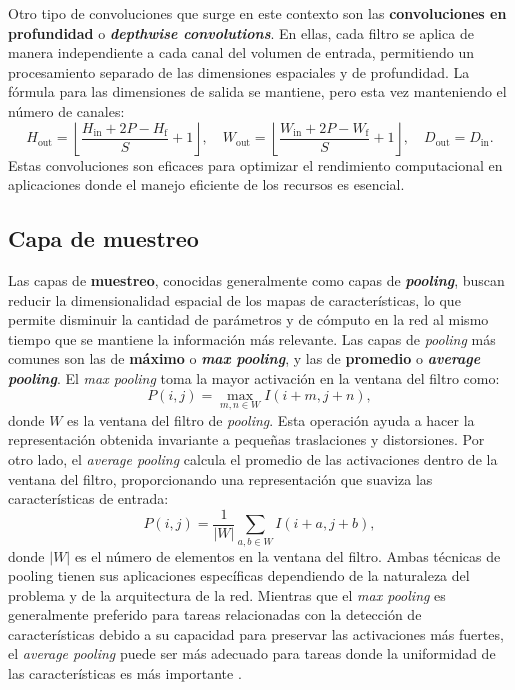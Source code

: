 Otro tipo de convoluciones que surge en este contexto son las \textbf{convoluciones
	en profundidad} o \textbf{\textit{depthwise convolutions}}. En ellas, cada
filtro se aplica de manera independiente a cada canal del volumen de entrada, permitiendo
un procesamiento separado de las dimensiones espaciales y de profundidad. La
fórmula para las dimensiones de salida se mantiene, pero esta vez manteniendo el
número de canales:
\[
H_{\text{out}}= \left\lfloor \frac{H_{\text{in}}+ 2P - H_{\text{f}}}{S}+ 1 \right
\rfloor, \quad W_{\text{out}}= \left\lfloor \frac{W_{\text{in}}+ 2P - W_{\text{f}}}{S}
+ 1 \right\rfloor, \quad D_{\text{out}}= D_{\text{in}}.
\]
Estas convoluciones son eficaces para optimizar el rendimiento computacional en
aplicaciones donde el manejo eficiente de los recursos es esencial.

\subsection{Capa de muestreo}

Las capas de \textbf{muestreo}, conocidas generalmente como capas de \textbf{\textit{pooling}},
buscan reducir la dimensionalidad espacial de los mapas de características, lo
que permite disminuir la cantidad de parámetros y de cómputo en la red al mismo
tiempo que se mantiene la información más relevante. Las capas de \textit{pooling}
más comunes son las de \textbf{máximo} o \textbf{\textit{max pooling}}, y las de
\textbf{promedio} o \textbf{\textit{average pooling}}. El \textit{max pooling} toma
la mayor activación en la ventana del filtro como:
\begin{equation}
	P(i, j) = \max_{m, n \in W}I(i+m, j+n),
\end{equation}
donde $W$ es la ventana del filtro de \textit{pooling}. Esta operación ayuda a
hacer la representación obtenida invariante a pequeñas traslaciones y
distorsiones. Por otro lado, el \textit{average pooling} calcula el promedio de las
activaciones dentro de la ventana del filtro, proporcionando una representación
que suaviza las características de entrada:
\begin{equation}
	P(i, j) = \frac{1}{|W|}\sum_{a, b \in W}I(i+a, j+b),
\end{equation}
donde $|W|$ es el número de elementos en la ventana del filtro. Ambas técnicas
de pooling tienen sus aplicaciones específicas dependiendo de la naturaleza del
problema y de la arquitectura de la red. Mientras que el \textit{max pooling} es
generalmente preferido para tareas relacionadas con la detección de
características debido a su capacidad para preservar las activaciones más
fuertes, el \textit{average pooling} puede ser más adecuado para tareas donde la
uniformidad de las características es más importante
\cite{krizhevsky2012imagenet}.

